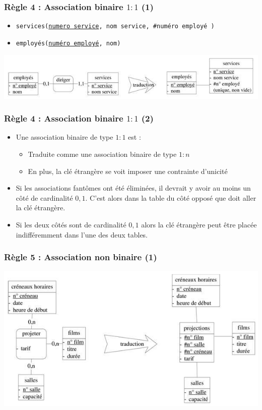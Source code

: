 \begin{frame}
  \frametitle{Règle 4 : Association binaire $1:1$ (1)}
  \begin{itemize}
    \item \texttt{services(\underline{numero service}, nom service, \#numéro employé )}
    \item \texttt{employés(\underline{numéro employé}, nom)}
  \end{itemize}
  \begin{center}
    \includegraphics[width=0.9\linewidth]{traduction_11.jpg}
  \end{center}
\end{frame}

\begin{frame}
  \frametitle{Règle 4 : Association binaire $1:1$ (2)}
  \begin{itemize}
    \item Une association binaire de type $1 : 1$ est :
      \begin{itemize}
        \item Traduite comme une association binaire de type $1 : n$
        \item En plus, la clé étrangère se voit imposer une contrainte d'unicité
      \end{itemize}
    \item Si les associations fantômes ont été éliminées, il devrait y avoir au moins un côté de cardinalité
      $0,1$. C'est alors dans la table du côté opposé que doit aller la clé étrangère.
    \item Si les deux côtés sont de cardinalité $0,1$ alors la clé étrangère peut être placée indifféremment
      dans l'une des deux tables.
  \end{itemize}
\end{frame}

\begin{frame}
  \frametitle{Règle 5 : Association non binaire (1)}
  \begin{center}
    \includegraphics[width=0.9\linewidth]{traduction_non_binaire.jpg}
  \end{center}
\end{frame}

